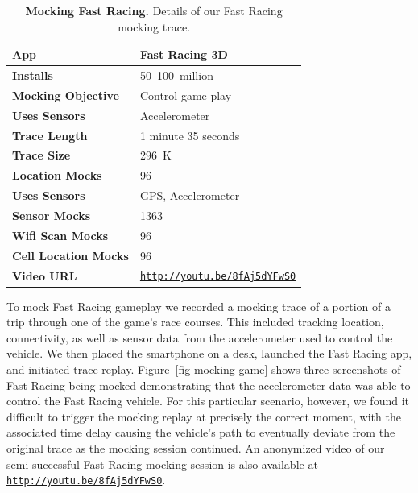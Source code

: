 \begin{table}[t]

\begin{tabularx}{3.33in}{lX}
\textbf{App} & Fast Racing 3D \\ \toprule
\textbf{Installs} & 50--100~million \\
  \textbf{Mocking Objective} & Control game play \\ \midrule
\textbf{Uses Sensors} & Accelerometer \\
\textbf{Trace Length} & 1 minute 35 seconds \\
\textbf{Trace Size} & 296~K \\
\textbf{Location Mocks} & 96 \\
\textbf{Uses Sensors} & GPS, Accelerometer \\
\textbf{Sensor Mocks} & 1363 \\
\textbf{Wifi Scan Mocks} & 96 \\
\textbf{Cell Location Mocks} & 96 \\
\textbf{Video URL} &
  \hyperlink{http://youtu.be/8fAj5dYFwS0}{\texttt{http://youtu.be/8fAj5dYFwS0}}
  \\

\end{tabularx}

\caption{\textbf{Mocking Fast Racing.} Details of our Fast Racing
  mocking trace.}

\label{table-mocking-game}
\vspace*{-0.2in}
\end{table}

To mock Fast Racing gameplay we recorded a mocking trace of a portion of a
trip through one of the game's race courses.  This included tracking location,
connectivity, as well as sensor data from the accelerometer used to control
the vehicle. We then placed the smartphone on a desk, launched the Fast
Racing app, and initiated trace replay. Figure~\ref{fig-mocking-game} shows
three screenshots of Fast Racing being mocked demonstrating that the
accelerometer data was able to control the Fast Racing vehicle. For this
particular scenario, however, we found it difficult to trigger the mocking
replay at precisely the correct moment, with the associated time delay
causing the vehicle's path to eventually deviate from the original trace as
the mocking session continued. An anonymized video of our semi-successful
Fast Racing mocking session is also available at
\hyperlink{http://youtu.be/8fAj5dYFwS0}{\texttt{http://youtu.be/8fAj5dYFwS0}}.

